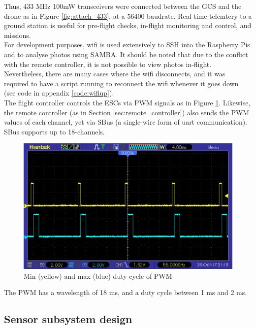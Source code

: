 Thus, 433 MHz 100mW transceivers were connected between the GCS and the drone as in Figure \ref{fig:attach_433}, at a 56400 baudrate. Real-time telemtery to a ground station is useful for pre-flight checks, in-flight monitoring and control, and missions.\\

For development purposes, wifi is used extensively to SSH into the Raspberry Pis and to analyse photos using SAMBA. It should be noted that due to the conflict with the remote controller, it is not possible to view photos in-flight. Nevertheless, there are many cases where the wifi disconnects, and it was required to have a script running to reconnect the wifi whenever it goes down (see code in appendix \ref{code:wifiup}).\\

The flight controller controls the ESCs via PWM signals as in Figure \ref{fig:pwm}. Likewise, the remote controller (as in Section \ref{sec:remote_controller}) also sends the PWM values of each channel, yet via SBus (a single-wire form of uart communication). SBus supports up to 18-channels.\\

\begin{figure}[H]
\centering
\includegraphics[scale=0.35]{images/pwm.jpg}
\caption{Min (yellow) and max (blue) duty cycle of PWM}
\label{fig:pwm}
\end{figure}

The PWM has a wavelength of 18 ms, and a duty cycle between 1 ms and 2 ms.

\subsection{Sensor subsystem design}

